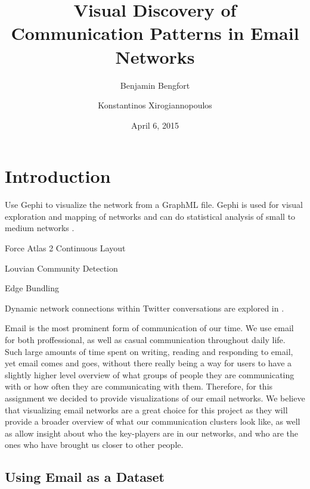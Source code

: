 \documentclass[11pt,letterpaper]{article}
\begin{document}
\title{Visual Discovery of Communication Patterns in Email Networks}

\author[ ]{Benjamin Bengfort}
\author[ ]{Konstantinos Xirogiannopoulos}

\date{April 6, 2015}

\maketitle

\section*{Introduction}

Use Gephi \cite{gephi_gephi-open_2010} to visualize the network from a GraphML \cite{brandes_graph_2010} file. Gephi is used for visual exploration and mapping of networks \cite{bastian_gephi:_2009} and can do statistical analysis of small to medium networks \cite{mcsweeney_gephi_2009}.

Force Atlas 2 Continuous Layout \cite{jacomy_forceatlas2_2014}

Louvian Community Detection \cite{de_meo_generalized_2011}

Edge Bundling \cite{pupyrev_edge_2012}

Dynamic network connections within Twitter conversations are explored in \cite{bruns_how_2012}.

Email is the most prominent form of communication of our time. We use email for both proffessional, as well as casual communication throughout daily life. Such large amounts of time spent on writing, reading and responding to email, yet email comes and goes, without there really being a way for users to have a slightly higher level overview of what groups of people they are communicating with or how often they are communicating with them. Therefore, for this assignment we decided to provide visualizations of our email networks. We believe that visualizing email networks are a great choice for this project as they will provide a broader overview of what our communication clusters look like, as well as allow insight about who the key-players are in our networks, and who are the ones  who have brought us closer to other people.

\subsection*{Using Email as a Dataset}
\end{document}
